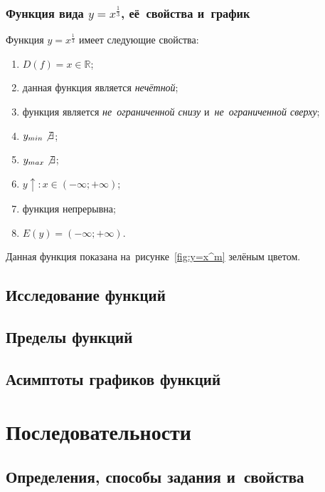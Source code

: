 \documentclass[]{scrartcl}
\begin{document}
\subsubsection{Функция вида ${\textstyle y=x^{\frac{1}{3}}}$, её~свойства и~график}
Функция ${\textstyle y=x^{\frac{1}{3}}}$ имеет следующие свойства:
\begin{enumerate}
	\item ${\textstyle D(f)=x \in \mathbb{R}}$;
	\item данная функция является \emph{нечётной};
	\item функция является \emph{не~ограниченной снизу} и~\emph{не~ограниченной сверху};
	\item ${\textstyle y_{min}\not \exists}$;
	\item ${\textstyle y_{max}\not \exists}$;
	\item ${\textstyle y\uparrow:x\in (-\infty;+\infty)}$;
	\item функция непрерывна;
	\item ${\textstyle E(y)=(-\infty;+\infty)}$.
\end{enumerate}
Данная функция показана на~рисунке~\ref{fig:y=x^m} зелёным цветом.

\subsection{Исследование функций}
\subsection{Пределы функций}
\subsection{Асимптоты графиков функций}

\section{Последовательности}
\subsection{Определения, способы задания и~свойства}
\end{document}
